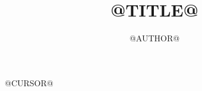 \documentclass{tim}
\author{@AUTHOR@}
\title{@TITLE@}
\begin{document}
\maketitle
@CURSOR@
\end{document}
